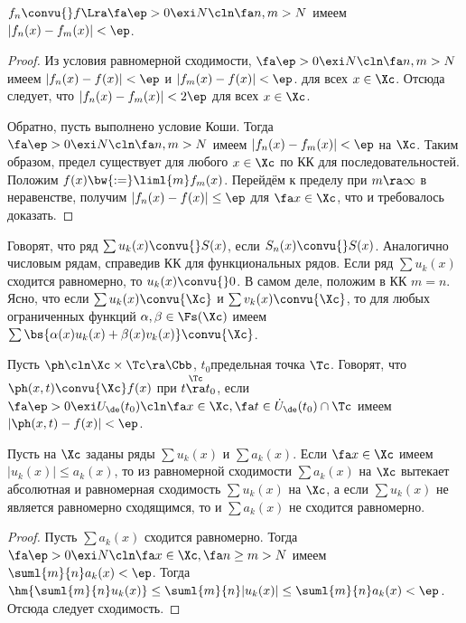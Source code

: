 \documentclass[a4paper]{article}
\begin{document}
\begin{theorem}
$f_n \convu{} f \Lra \fa \ep > 0 \exi N\cln \fa n,m > N$ имеем $|f_n(x) - f_m(x)| < \ep$.
\end{theorem}
\begin{proof}
Из условия равномерной сходимости, $\fa \ep > 0 \exi N\cln \fa n, m > N$ имеем $|f_n(x) - f(x)| < \ep$ и $|f_m(x) - f(x)| < \ep$.
для всех $x \in \Xc$. Отсюда следует, что $|f_n(x) - f_m(x)| < 2\ep$ для всех $x \in \Xc$.

Обратно, пусть выполнено условие Коши. Тогда $\fa \ep > 0 \exi N\cln \fa n,m > N$ имеем $|f_n(x) - f_m(x)| < \ep$ на $\Xc$. Таким образом,
предел существует для любого $x \in \Xc$ по КК для последовательностей. Положим $f(x) \bw{:=} \liml{m} f_m(x)$. Перейдём к пределу при $m \ra \infty$ в неравенстве,
получим $|f_n(x) - f(x)| \le \ep$ для $\fa x \in \Xc$, что и требовалось доказать.
\end{proof}

Говорят, что ряд $\sum u_k(x)\convu{} S(x)$, если $S_n(x)\convu{}S(x)$. Аналогично числовым рядам, справедив КК для
функциональных рядов. Если ряд $\sum u_k(x)$ сходится равномерно, то $u_k(x)\convu{}0$. В самом деле, положим в КК $m=n$.
Ясно, что если $\sum u_k(x) \convu{\Xc}$ и $\sum v_k(x)\convu{\Xc}$, то для любых ограниченных функций
$\alpha, \beta \in \Fs(\Xc)$ имеем $\sum \bs{\alpha(x)u_k(x) + \beta(x)v_k(x)} \convu{\Xc}$.

\begin{df}
Пусть $\ph\cln \Xc \times \Tc \ra \Cbb$, $t_0$\т предельная точка $\Tc$. Говорят, что $\ph(x,t) \convu{\Xc} f(x)$ при
$t \overset{\Tc}{\ra} t_0$, если $\fa \ep > 0 \exi U_\de(t_0)\cln \fa x \in \Xc, \fa t \in \dot{U}_\de(t_0) \cap \Tc$ имеем $|\ph(x,t)-f(x)| < \ep$.
\end{df}

\begin{theorem}
Пусть на $\Xc$ заданы ряды $\sum u_k(x)$ и $\sum a_k(x)$. Если $\fa x \in \Xc$ имеем $|u_k(x)| \le a_k(x)$,
то из равномерной сходимости $\sum a_k(x)$ на $\Xc$ вытекает абсолютная и равномерная сходимость $\sum u_k(x)$ на $\Xc$, а если
$\sum u_k(x)$ не является равномерно сходящимся, то и $\sum a_k(x)$ не сходится равномерно.
\end{theorem}
\begin{proof}
Пусть $\sum a_k(x)$ сходится равномерно. Тогда $\fa \ep > 0 \exi N\cln \fa x \in \Xc,\fa n \ge m > N$ имеем $\suml{m}{n} a_k(x) < \ep$. Тогда
$\hm{\suml{m}{n} u_k(x)} \le \suml{m}{n}|u_k(x)|\le \suml{m}{n} a_k(x) < \ep$. Отсюда следует сходимость.
\end{proof}
\end{document}
